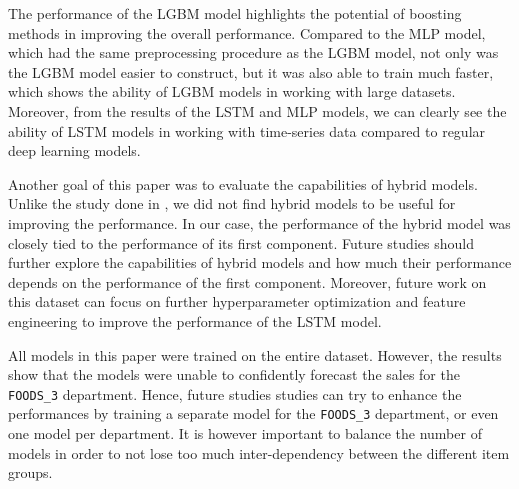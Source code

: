 The performance of the LGBM model highlights the potential of boosting methods in improving the overall performance. 
Compared to the MLP model, which had the same preprocessing procedure as the LGBM model, not only was the LGBM model easier to construct, but it was also able to train much faster, which shows the ability of LGBM models in working with large datasets.
Moreover, from the results of the LSTM and MLP models, we can clearly see the ability of LSTM models in working with time-series data compared to regular deep learning models.

Another goal of this paper was to evaluate the capabilities of hybrid models.
Unlike the study done in \cite{c8}, we did not find hybrid models to be useful for improving the performance.
In our case, the performance of the hybrid model was closely tied to the performance of its first component.
Future studies should further explore the capabilities of hybrid models and how much their performance depends on the performance of the first component.
Moreover, future work on this dataset can focus on further hyperparameter optimization and feature engineering to improve the performance of the LSTM model.

All models in this paper were trained on the entire dataset.
However, the results show that the models were unable to confidently forecast the sales for the \texttt{FOODS\_3} department. 
Hence, future studies studies can try to enhance the performances by training a separate model for the \texttt{FOODS\_3} department, or even one model per department.
It is however important to balance the number of models in order to not lose too much inter-dependency between the different item groups.